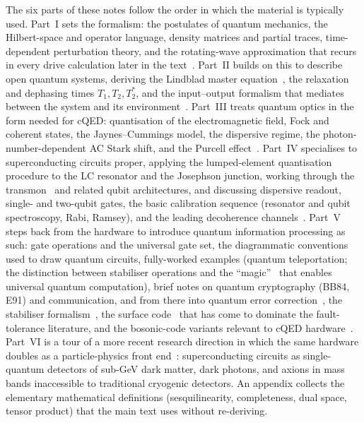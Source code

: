 The six parts of these notes follow the order in which the
material is typically used. Part~I sets the formalism: the
postulates of quantum mechanics, the Hilbert-space and operator
language, density matrices and partial traces, time-dependent
perturbation theory, and the rotating-wave approximation that
recurs in every drive calculation later in the
text~\cite{nielsen2010}. Part~II builds on this to describe open
quantum systems, deriving the Lindblad master
equation~\cite{lindblad1976}, the relaxation and dephasing
times $T_1, T_2, T_2^*$, and the input--output formalism that
mediates between the system and its
environment~\cite{gardiner2004,breuer2002}. Part~III treats
quantum optics in the form needed for cQED: quantisation of the
electromagnetic field, Fock and coherent states, the
Jaynes--Cummings model, the dispersive regime, the
photon-number-dependent AC Stark shift, and the Purcell
effect~\cite{haroche2006,walls2008,blais2021}. Part~IV specialises
to superconducting circuits proper, applying the lumped-element
quantisation procedure to the LC resonator and the Josephson
junction, working through the transmon~\cite{koch2007} and related
qubit architectures, and discussing dispersive readout, single-
and two-qubit gates, the basic calibration sequence
(resonator and qubit spectroscopy, Rabi, Ramsey), and the leading
decoherence channels~\cite{krantz2019,blais2021,vool2017}.
Part~V steps back from the hardware to introduce quantum
information processing as such: gate operations and the universal
gate set, the diagrammatic conventions used to draw quantum
circuits, fully-worked examples (quantum teleportation; the
distinction between stabiliser operations and the
``magic''~\cite{bravyi2005} that enables universal quantum
computation), brief notes on quantum cryptography (BB84, E91) and
communication, and from there into quantum error
correction~\cite{shor1995,steane1996}, the stabiliser
formalism~\cite{gottesman1997}, the surface code~\cite{fowler2012}
that has come to dominate the fault-tolerance literature, and the
bosonic-code variants relevant to cQED
hardware~\cite{michael2016}. Part~VI is a tour of a more recent
research direction in which the same hardware doubles as a
particle-physics front end~\cite{dixit2021,hochberg2021,linehan2024}:
superconducting circuits as single-quantum detectors of sub-GeV
dark matter, dark photons, and axions in mass bands inaccessible
to traditional cryogenic detectors. An appendix collects the
elementary mathematical definitions (sesquilinearity, completeness,
dual space, tensor product) that the main text uses without
re-deriving.


